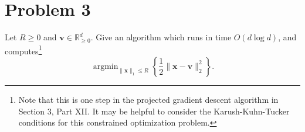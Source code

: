 \section*{Problem 3}

Let $R \geq 0$ and $\mathbf{v} \in \mathbb{R}^d_{\geq 0}$. Give an algorithm which runs in time $O(d \log d)$, and computes\footnote{Note that this is one step in the projected gradient descent algorithm in Section 3, Part XII. It may be helpful to consider the Karush-Kuhn-Tucker conditions for this constrained optimization problem.}
\[
\operatorname{argmin}_{\|\mathbf{x}\|_1 \leq R} \left\{ \frac{1}{2} \|\mathbf{x} - \mathbf{v}\|_2^2 \right\}.
\]

